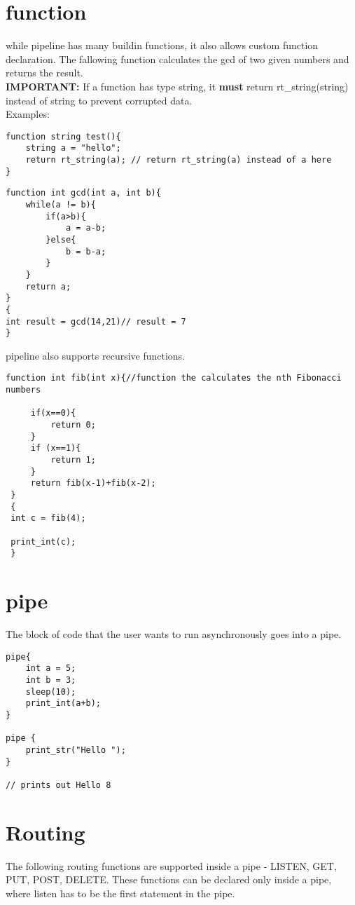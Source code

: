 \documentclass[./Report_main.tex]{subfiles}
\begin{document}
\section{function}
while pipeline has many buildin functions, it also allows custom function declaration. The fallowing function calculates the gcd of two given numbers and returns the result.\\
\textbf{IMPORTANT:} If a function has type string, it \textbf{must} return rt\_string(string) instead of string to prevent corrupted data.\\
Examples:\\
\begin{lstlisting}
function string test(){
    string a = "hello";
    return rt_string(a); // return rt_string(a) instead of a here
}
\end{lstlisting}
\begin{lstlisting}
function int gcd(int a, int b){
    while(a != b){
        if(a>b){
            a = a-b;
        }else{
            b = b-a;
        }
    }
    return a;
}
{
int result = gcd(14,21)// result = 7
}
\end{lstlisting}
pipeline also supports recursive functions.\\
\begin{lstlisting}
function int fib(int x){//function the calculates the nth Fibonacci numbers
 
     if(x==0){
         return 0;
     }
     if (x==1){
         return 1;
     }
     return fib(x-1)+fib(x-2);
 }
 {
 int c = fib(4);
 
 print_int(c);
 }
\end{lstlisting}

\section{pipe}
The block of code that the user wants to run asynchronously goes into a pipe.\\
\begin{lstlisting}
pipe{
	int a = 5;
	int b = 3;
	sleep(10);
	print_int(a+b);
}

pipe {
    print_str("Hello "); 
}

// prints out Hello 8

\end{lstlisting}

\section{Routing}
The following routing functions are supported inside a pipe - LISTEN, GET, PUT, POST, DELETE. These functions can be declared only inside a pipe, where listen has to be the first statement in the pipe.
\end{document}
